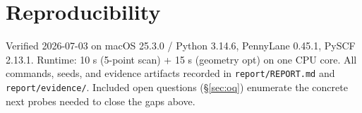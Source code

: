 \documentclass[11pt]{article}
\begin{document}
\section{Reproducibility}
Verified 2026-07-03 on macOS 25.3.0 / Python 3.14.6, PennyLane 0.45.1,
PySCF 2.13.1. Runtime: 10 s (5-point scan) + 15 s (geometry opt) on one CPU
core. All commands, seeds, and evidence artifacts recorded in
\texttt{report/REPORT.md} and \texttt{report/evidence/}. Included open questions
(\S\ref{sec:oq}) enumerate the concrete next probes needed to close the gaps above.


\end{document}
